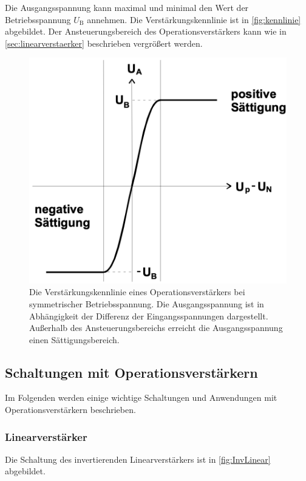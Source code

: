 
Die Ausgangsspannung kann maximal und minimal den Wert der Betriebsspannung $U_\text{B}$ annehmen. Die Verstärkungskennlinie ist in \autoref{fig:kennlinie} abgebildet. Der Ansteuerungsbereich des Operationsverstärkers kann wie in \autoref{sec:linearverstaerker} beschrieben vergrößert werden.

\begin{figure}
    \centering
    \includegraphics[width=0.5\linewidth]{./figures/Kennlinie.png}
    \caption{Die Verstärkungskennlinie eines Operationsverstärkers bei symmetrischer Betriebsspannung. Die Ausgangsspannung ist in Abhängigkeit der Differenz der Eingangsspannungen dargestellt. Außerhalb des Ansteuerungsbereichs erreicht die Ausgangsspannung einen Sättigungsbereich. \cite{V51old}} 
    \label{fig:kennlinie}
\end{figure}



\newpage
\subsection{Schaltungen mit Operationsverstärkern}
\label{sec:Schaltungen}

Im Folgenden werden einige wichtige Schaltungen und Anwendungen mit Operationsverstärkern beschrieben.

\subsubsection{Linearverstärker}
\label{sec:linearverstaerker}
Die Schaltung des invertierenden Linearverstärkers ist in \autoref{fig:InvLinear} abgebildet.

